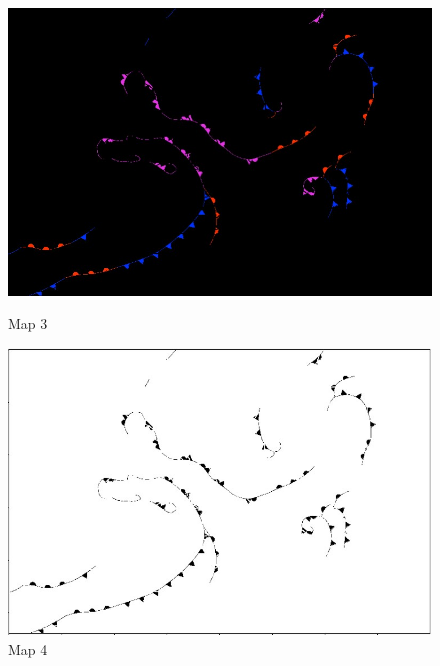 \documentclass{article}
\begin{document}
\begin{figure}[!htb]
   \begin{minipage}{0.48\textwidth}
     \centering
     \includegraphics[width=.7\linewidth]{map3.jpg}
     \caption{Map 3}\label{Fig:Data3}
   \end{minipage}\hfill
   \begin{minipage}{0.48\textwidth}
     \centering
     \includegraphics[width=.7\linewidth]{map4.jpg}
     \caption{Map 4}\label{Fig:Data4}
   \end{minipage}
\end{figure}
\end{document}
